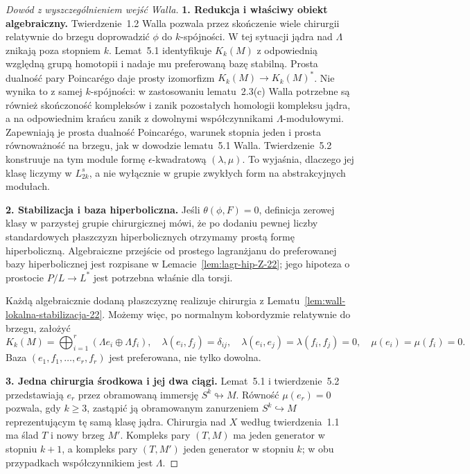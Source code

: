 \begin{proof}[Dowód z wyszczególnieniem wejść Walla]
\textbf{1. Redukcja i właściwy obiekt algebraiczny.}
Twierdzenie~1.2 Walla pozwala przez skończenie wiele
chirurgii relatywnie do brzegu doprowadzić $\phi$ do
$k$-spójności. W tej sytuacji jądra nad $\Lambda$ znikają
poza stopniem $k$. Lemat~5.1 identyfikuje
$K_k(M)$ z odpowiednią względną grupą homotopii i nadaje
mu preferowaną bazę stabilną. Prosta dualność pary
Poincarégo daje prosty izomorfizm $K_k(M)\to K_k(M)^*$.
Nie wynika to z samej $k$-spójności: w zastosowaniu
lematu~2.3(c) Walla potrzebne są również skończoność
kompleksów i zanik pozostałych homologii kompleksu
jądra, a na odpowiednim krańcu zanik z dowolnymi
współczynnikami $\Lambda$-modułowymi. Zapewniają je
prosta dualność Poincarégo, warunek stopnia jeden
i prosta równoważność na brzegu, jak w dowodzie
lematu~5.1 Walla.
Twierdzenie~5.2 konstruuje na tym module formę
$\epsilon$-kwadratową $(\lambda,\mu)$.
To wyjaśnia, dlaczego jej klasę liczymy w $L^s_{2k}$,
a nie wyłącznie w grupie zwykłych form na abstrakcyjnych
modułach.

\textbf{2. Stabilizacja i baza hiperboliczna.}
Jeśli $\theta(\phi,F)=0$, definicja zerowej klasy
w parzystej grupie chirurgicznej mówi, że po dodaniu
pewnej liczby standardowych płaszczyzn hiperbolicznych
otrzymamy prostą formę hiperboliczną. Algebraiczne
przejście od prostego lagranżjanu do preferowanej bazy
hiperbolicznej jest rozpisane w
Lemacie~\ref{lem:lagr-hip-Z-22}; jego hipoteza o prostocie
$P/L\to L^*$ jest potrzebna właśnie dla torsji.

Każdą algebraicznie dodaną płaszczyznę realizuje
chirurgia z
Lematu~\ref{lem:wall-lokalna-stabilizacja-22}.
Możemy więc, po
normalnym kobordyzmie relatywnie do brzegu, założyć
\[
 K_k(M)=\bigoplus_{i=1}^{r}(\Lambda e_i\oplus\Lambda f_i),
 \quad \lambda(e_i,f_j)=\delta_{ij},\quad
 \lambda(e_i,e_j)=\lambda(f_i,f_j)=0,
 \quad \mu(e_i)=\mu(f_i)=0.
\tag{H}
\]
Baza $(e_1,f_1,\ldots,e_r,f_r)$ jest preferowana,
nie tylko dowolna.

\textbf{3. Jedna chirurgia środkowa i jej dwa ciągi.}
Lemat~5.1 i twierdzenie~5.2 przedstawiają $e_r$
przez obramowaną immersję $S^k\looparrowright M$.
Równość $\mu(e_r)=0$ pozwala, gdy $k\geq3$,
zastąpić ją obramowanym zanurzeniem
$S^k\hookrightarrow M$ reprezentującym tę samą klasę
jądra. Chirurgia nad $X$ według twierdzenia~1.1
ma ślad $T$ i nowy brzeg $M'$. Kompleks pary
$(T,M)$ ma jeden generator w stopniu $k+1$,
a kompleks pary $(T,M')$ jeden generator w stopniu $k$;
w obu przypadkach współczynnikiem jest $\Lambda$.


\end{proof}
